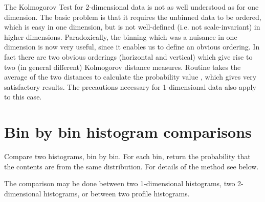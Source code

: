 The Kolmogorov Test for 2-dimensional data is not as well
understood as for one dimension.
The basic problem is that it requires the unbinned data to be
ordered, which is easy in one dimension, but is not
well-defined
(i.e. not scale-invariant) in higher dimensions.
Paradoxically, the binning which was a nuisance in one dimension
is now very useful, since it enables us to define
an obvious ordering.
In fact there are two obvious orderings (horizontal and vertical)
which give rise to two (in general different) Kolmogorov
distance measures.
Routine  takes the average of the two distances
to calculate the probability value ,
which gives very satisfactory results.
The precautions necessary for 1-dimensional data also apply to this case.
 
\newpage%

\section{Bin by bin histogram comparisons}


\Action Compare two histograms, bin by bin. For each bin, return the
        probability that the contents are from the same distribution.  
        For details of the method see below.

        The comparison may be done between two 1-dimensional histograms,
        two 2-dimensional histograms, or between two profile histograms.

